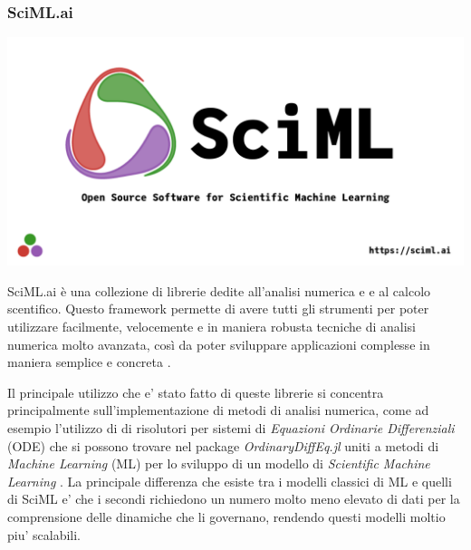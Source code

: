 \subsubsection{SciML.ai}

\begin{minipage}{\linewidth}
    \centering
    \includegraphics[width=\textwidth]{img/SciMLGitHubPreview.png}
    \label{fig:SciML.ai}
\end{minipage}

SciML.ai è una collezione di librerie dedite all'analisi numerica e 
e al calcolo scentifico. Questo framework permette di 
avere tutti gli strumenti per poter utilizzare facilmente, 
velocemente e in maniera robusta tecniche di analisi numerica 
molto avanzata, così da poter sviluppare applicazioni complesse 
in maniera semplice e concreta
\cite{rackauckas2017differentialequations} 
\cite{rackauckas2019diffeqflux} 
\cite{rackauckas2020universal}. 

Il principale utilizzo che e' stato fatto di queste librerie si 
concentra principalmente sull'implementazione di metodi di analisi 
numerica, come ad esempio l'utilizzo di di risolutori per sistemi 
di \emph{Equazioni Ordinarie Differenziali} (ODE) che si possono 
trovare nel package \emph{OrdinaryDiffEq.jl} \cite{rackauckas2017differentialequations} 
uniti a metodi di \emph{Machine Learning} (ML) \cite{pal2023lux} \cite{Flux.jl-2018} \cite{innes:2018}
per lo sviluppo di un modello di \emph{Scientific Machine Learning}
\cite{rackauckas2019diffeqflux} \cite{rackauckas2020universal}. 
La principale differenza che esiste tra i modelli classici di ML e quelli 
di SciML e' che i secondi richiedono un numero molto meno elevato di 
dati per la comprensione delle dinamiche che li governano, rendendo questi 
modelli moltio piu' scalabili.


